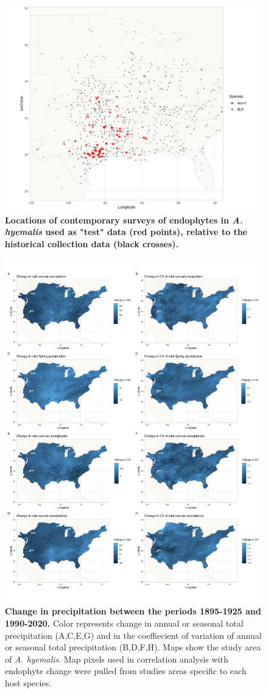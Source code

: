 \documentclass[11pt]{article}
\begin{document}
\begin{figure}[H]
	\centering
	\includegraphics[width = \linewidth]{test_data_map.png}
	\caption{\textbf{Locations of contemporary surveys of endophytes in \emph{A. hyemalis} used as "test" data (red points), relative to the historical collection data (black crosses).}}
\end{figure}

	\begin{figure}[H]
	\centering
	\includegraphics[width = .8\linewidth]{ppt_change_maps.png}
	\caption{\textbf{Change in precipitation between the periods 1895-1925 and 1990-2020.} Color represents change in annual or seasonal total precipitation (A,C,E,G) and in the coeffiecient of variation of annual or seasonal total precipitation (B,D,F,H). Maps show the study area of \emph{A. hyemalis}. Map pixels used in correlation analysis with endophyte change were pulled from studies areas specific to each host species. }
\end{figure}
\end{document}
